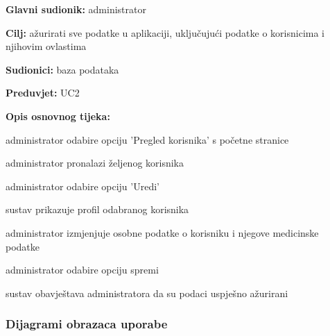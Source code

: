         
                    \noindent {}
					\begin{packed_item}
	
						\item \textbf{Glavni sudionik: }administrator
						\item  \textbf{Cilj:} ažurirati sve podatke u aplikaciji, uključujući podatke o korisnicima i njihovim ovlastima
						\item  \textbf{Sudionici:} baza podataka
						\item  \textbf{Preduvjet:} UC2
						\item  \textbf{Opis osnovnog tijeka:}
						
						\item[] \begin{packed_enum}
							\item administrator odabire opciju 'Pregled korisnika' s početne stranice
							\item administrator pronalazi željenog korisnika
							\item administrator odabire opciju 'Uredi'
							\item sustav prikazuje profil odabranog korisnika
							\item administrator izmjenjuje osobne podatke o korisniku i njegove medicinske podatke
							\item administrator odabire opciju spremi
							\item sustav obavještava administratora da su podaci uspješno ažurirani
						
						\end{packed_enum}
					
					\end{packed_item}

    
				\subsubsection{Dijagrami obrazaca uporabe}
					
